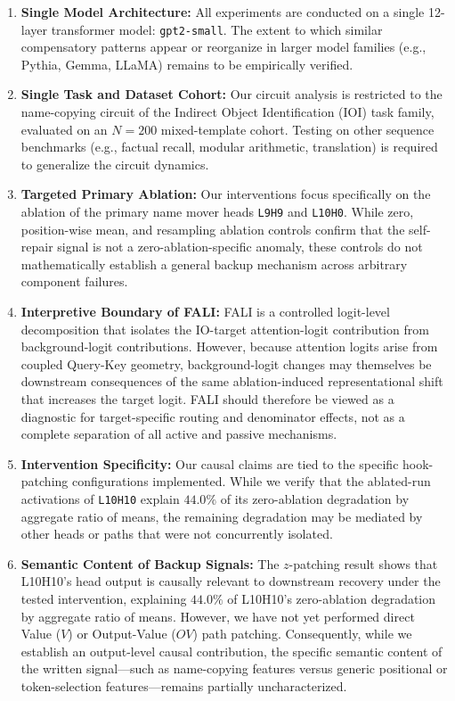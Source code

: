 \documentclass[12pt,a4paper]{article}
\begin{document}
\begin{enumerate}
  \item \textbf{Single Model Architecture:} All experiments are conducted on a single 12-layer transformer model: \texttt{gpt2-small}. The extent to which similar compensatory patterns appear or reorganize in larger model families (e.g., Pythia, Gemma, LLaMA) remains to be empirically verified.
  \item \textbf{Single Task and Dataset Cohort:} Our circuit analysis is restricted to the name-copying circuit of the Indirect Object Identification (IOI) task family, evaluated on an $N=200$ mixed-template cohort. Testing on other sequence benchmarks (e.g., factual recall, modular arithmetic, translation) is required to generalize the circuit dynamics.
  \item \textbf{Targeted Primary Ablation:} Our interventions focus specifically on the ablation of the primary name mover heads \texttt{L9H9} and \texttt{L10H0}. While zero, position-wise mean, and resampling ablation controls confirm that the self-repair signal is not a zero-ablation-specific anomaly, these controls do not mathematically establish a general backup mechanism across arbitrary component failures.
  \item \textbf{Interpretive Boundary of FALI:} FALI is a controlled logit-level decomposition that isolates the IO-target attention-logit contribution from background-logit contributions. However, because attention logits arise from coupled Query-Key geometry, background-logit changes may themselves be downstream consequences of the same ablation-induced representational shift that increases the target logit. FALI should therefore be viewed as a diagnostic for target-specific routing and denominator effects, not as a complete separation of all active and passive mechanisms.
  \item \textbf{Intervention Specificity:} Our causal claims are tied to the specific hook-patching configurations implemented. While we verify that the ablated-run activations of \texttt{L10H10} explain $44.0\%$ of its zero-ablation degradation by aggregate ratio of means, the remaining degradation may be mediated by other heads or paths that were not concurrently isolated.
  \item \textbf{Semantic Content of Backup Signals:} The $z$-patching result shows that L10H10's head output is causally relevant to downstream recovery under the tested intervention, explaining $44.0\%$ of L10H10's zero-ablation degradation by aggregate ratio of means. However, we have not yet performed direct Value ($V$) or Output-Value ($OV$) path patching. Consequently, while we establish an output-level causal contribution, the specific semantic content of the written signal---such as name-copying features versus generic positional or token-selection features---remains partially uncharacterized.
\end{enumerate}
\end{document}

